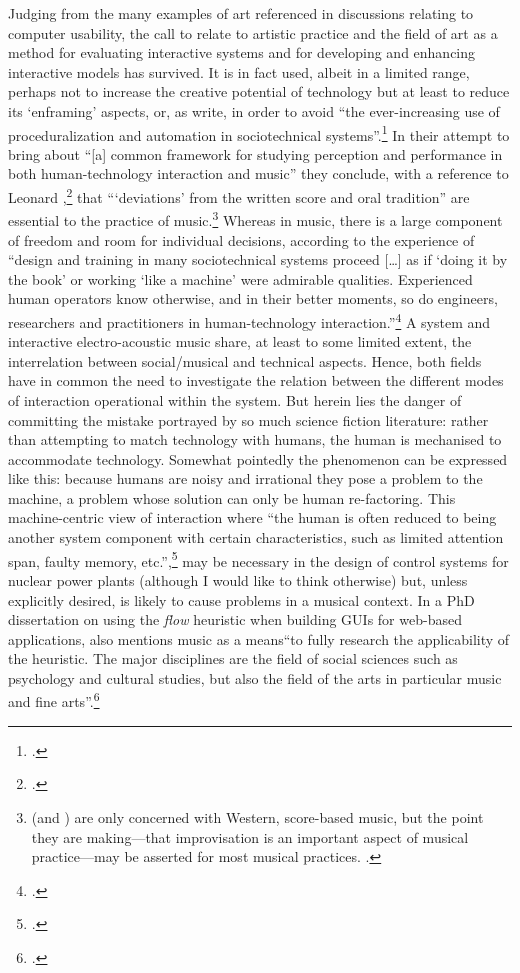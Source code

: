 Judging from the many examples of art referenced in discussions relating to computer usability, the call to relate to artistic practice and the field of art as a method for evaluating interactive systems and for developing and enhancing interactive models has survived. It is in fact used, albeit in a limited range, perhaps not to increase the creative potential of technology but at least to reduce its `enframing' aspects, or, as \citeauthor{kirlik04} write, in order to avoid ``the ever-increasing use of proceduralization and automation in sociotechnical systems''.\footcite[629]{kirlik04} In their attempt to bring about ``[a] common framework for studying perception and performance in both human-technology interaction and music'' they conclude, with a reference to Leonard \citeauthor{meyer56},\footcite{meyer56} that ```deviations' from the written score and oral tradition'' are essential to the practice of music.\footnote{\citeauthor{kirlik04} (and \citeauthor{meyer56}) are only concerned with Western, score-based music, but the point they are making---that improvisation is an important aspect of musical practice---may be asserted for most musical practices. \cite[See also][]{benson03}.} Whereas in music, there is a large component of freedom and room for individual decisions, according to the experience of \citeauthor{kirlik04} ``design and training in many sociotechnical systems proceed [\ldots] as if `doing it by the book' or working `like a machine' were admirable qualities. Experienced human operators know otherwise, and in their better moments, so do engineers, researchers and practitioners in human-technology interaction.''\footcite[629]{kirlik04} A  system and interactive electro-acoustic music share, at least to some limited extent, the interrelation between social/musical and technical aspects. Hence, both fields have in common the need to investigate the relation between the different modes of interaction operational within the system. But herein lies the danger of committing the mistake portrayed by so much science fiction literature: rather than attempting to match technology with humans, the human is mechanised to accommodate technology. Somewhat pointedly the phenomenon can be expressed like this: because humans are noisy and irrational they pose a problem to the machine, a problem whose solution can only be human re-factoring. This machine-centric view of interaction where ``the human is often reduced to being another system component with certain characteristics, such as limited attention span, faulty memory, etc.'',\footcite[Bannon, L. as quoted in][27]{kuutti96} may be necessary in the design of control systems for nuclear power plants (although I would like to think otherwise) but, unless explicitly desired, is likely to cause problems in a musical context. In a PhD dissertation on using the \emph{flow} heuristic when building GUIs for web-based applications, \citeauthor{thomassen03} also mentions music as a means``to fully research the applicability of the heuristic. The major disciplines are the field of social sciences such as psychology and cultural studies, but also the field of the arts in particular music and fine arts''.\footcite[239]{thomassen03}


